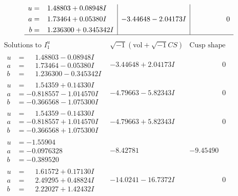 \documentclass[1p]{elsarticle_modified}
\theoremstyle{definition}
\newcommand{\I}{\sqrt{-1}}
\begin{document}
$$\begin{array}{c|c|c}
\begin{aligned}
u &= \phantom{-}1.48803 + 0.08948 I \\
a &= \phantom{-}1.73464 + 0.05380 I \\
b &= \phantom{-}1.236300 + 0.345342 I\end{aligned}
 & -3.44648 - 2.04173 I & \phantom{-0.000000 } 0\\
 \hline 
 \end{array}$$\newpage$$\begin{array}{c|c|c}  
\text{Solutions to }I^u_{1}& \I (\text{vol} + \sqrt{-1}CS) & \text{Cusp shape}\\
 \hline 
\begin{aligned}
u &= \phantom{-}1.48803 - 0.08948 I \\
a &= \phantom{-}1.73464 - 0.05380 I \\
b &= \phantom{-}1.236300 - 0.345342 I\end{aligned}
 & -3.44648 + 2.04173 I & \phantom{-0.000000 } 0 \\ \hline\begin{aligned}
u &= \phantom{-}1.54359 + 0.14330 I \\
a &= -0.818557 - 1.014570 I \\
b &= -0.366568 - 1.075300 I\end{aligned}
 & -4.79663 - 5.82343 I & \phantom{-0.000000 } 0 \\ \hline\begin{aligned}
u &= \phantom{-}1.54359 - 0.14330 I \\
a &= -0.818557 + 1.014570 I \\
b &= -0.366568 + 1.075300 I\end{aligned}
 & -4.79663 + 5.82343 I & \phantom{-0.000000 } 0 \\ \hline\begin{aligned}
u &= -1.55904\phantom{ +0.000000I} \\
a &= -0.0976328\phantom{ +0.000000I} \\
b &= -0.389520\phantom{ +0.000000I}\end{aligned}
 & -8.42781\phantom{ +0.000000I} & -9.45490\phantom{ +0.000000I} \\ \hline\begin{aligned}
u &= \phantom{-}1.61572 + 0.17130 I \\
a &= \phantom{-}2.49295 + 0.48824 I \\
b &= \phantom{-}2.22027 + 1.42432 I\end{aligned}
 & -14.0241 - 16.7372 I & \phantom{-0.000000 } 0 \\ \hline\begin{aligned}

\end{aligned}
\end{array}$$
\end{document}
